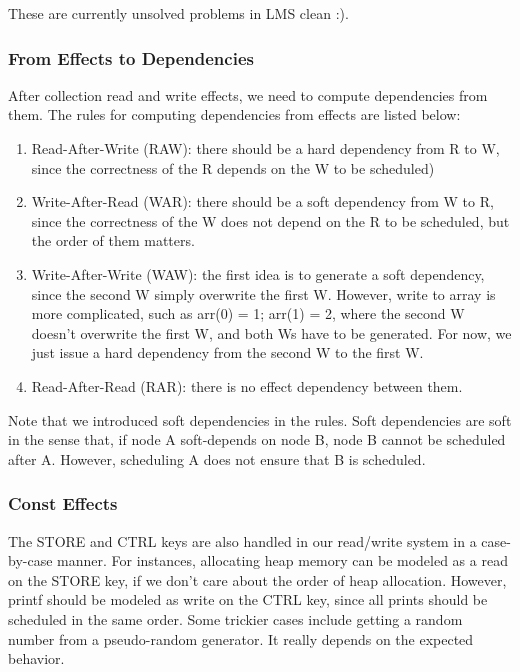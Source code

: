 These are currently unsolved problems in LMS clean :).

\subsubsection{From Effects to Dependencies}

After collection read and write effects, we need to compute dependencies from them. The
rules for computing dependencies from effects are listed below:

\begin{enumerate}
\item Read-After-Write (RAW): there should be a hard dependency from R to W,
  since the correctness of the R depends on the W to be scheduled)
\item Write-After-Read (WAR): there should be a soft dependency from W to R,
  since the correctness of the W does not depend on the R to be scheduled, but the order of them matters.
\item Write-After-Write (WAW): the first idea is to generate a soft dependency,
  since the second W simply overwrite the first W.
  However, write to array is more complicated, such as arr(0) = 1; arr(1) = 2,
  where the second W doesn’t overwrite the first W, and both Ws have to be generated.
  For now, we just issue a hard dependency from the second W to the first W.
\item Read-After-Read (RAR): there is no effect dependency between them.
\end{enumerate}

Note that we introduced soft dependencies in the rules.
Soft dependencies are soft in the sense that, if node A soft-depends on node B,
node B cannot be scheduled after A. However, scheduling A does not ensure that B is scheduled.

\subsubsection{Const Effects}

The STORE and CTRL keys are also handled in our read/write system in a case-by-case manner.
For instances, allocating heap memory can be modeled as a read on the STORE key,
if we don’t care about the order of heap allocation.
However, printf should be modeled as write on the CTRL key, since all prints should be
scheduled in the same order.
Some trickier cases include getting a random number from a pseudo-random generator.
It really depends on the expected behavior.

